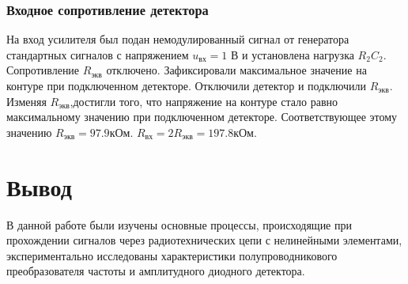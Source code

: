 \subsubsection{Входное сопротивление детектора}
На вход усилителя был подан немодулированный сигнал от генератора стандартных
сигналов с напряжением $u_{\text{вх}} = 1\text{ В}$ и установлена нагрузка $R_2 C_2$. Сопротивление $R_{\text{экв}}$  отключено. Зафиксировали максимальное значение на контуре при подключенном детекторе. Отключили детектор и подключили $R_{\text{экв}}$. Изменяя $R_{\text{экв}}$,достигли того, что напряжение на контуре стало равно максимальному значению при подключенном детекторе. Соответствующее этому значению $R_{\text{экв}} =97.9 \text{кОм}$. $R_{\text{вх}} = 2R_{\text{экв}} = 197.8\text{кОм}$. 
\section{Вывод}
В данной работе были изучены основные процессы, происходящие при прохождении сигналов через радиотехнических цепи с нелинейными элементами, экспериментально исследованы характеристики полупроводникового преобразователя частоты и амплитудного диодного детектора. 



